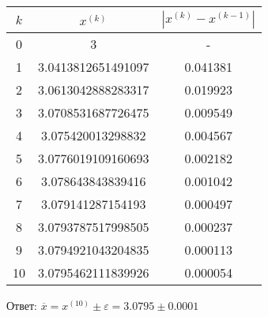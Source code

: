 \documentclass[a4paper,12pt]{report} %
\begin{document}
\begin{tabular}{ | c | c | c |}
	\hline
	$k$ & $x^{(k)}$ & $|x^{(k)} - x^{(k-1)}|$ \\ \hline
	0 & 3 & -  \\ \hline
	1 & 3.0413812651491097 & 0.041381  \\ \hline
	2 & 3.0613042888283317 & 0.019923  \\ \hline
	3 & 3.0708531687726475 & 0.009549  \\ \hline
	4 & 3.075420013298832 & 0.004567  \\ \hline
	5 & 3.0776019109160693 & 0.002182  \\ \hline
	6 & 3.078643843839416 & 0.001042  \\ \hline
	7 & 3.079141287154193 & 0.000497  \\ \hline
	8 & 3.0793787517998505 & 0.000237  \\ \hline
	9 & 3.0794921043204835 & 0.000113  \\ \hline
	10 & 3.0795462111839926 & 0.000054  \\ \hline
\end{tabular}

Ответ: $\overline{x} = x^{(10)} \pm \varepsilon = 3.0795 \pm 0.0001$
\end{document}
